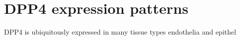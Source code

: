 \section{DPP4 expression patterns}
DPP4 is ubiquitously expressed in many tissue types endothelia and epithel